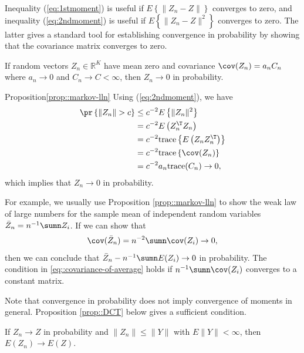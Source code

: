 Inequality (\ref{eq:1stmoment}) is useful if $E\left\{ \|Z_{n}-Z\|\right\} $
converges to zero, and inequality (\ref{eq:2ndmoment}) is useful
if $E\left\{ \|Z_{n}-Z\|^{2}\right\} $ converges to zero. The latter
gives a standard tool for establishing convergence in probability
by showing that the covariance matrix converges to zero.

\begin{proposition}\label{prop::markov-lln}
If random vectors $Z_{n}\in\mathbb{R}^{K}$ have mean zero and covariance
$\cov(Z_{n})=a_{n}C_{n}$ where $a_{n}\rightarrow0$ and $C_{n}\rightarrow C<\infty$,
then $Z_{n}\rightarrow0$ in probability. 
\end{proposition}


\begin{myproof}{Proposition}{\ref{prop::markov-lln}}
Using (\ref{eq:2ndmoment}), we have
\begin{align*}
\pr\left\{ \|Z_{n}\|>c\right\}  & \leq c^{-2}E\left\{ \|Z_{n}\|^{2}\right\} \\
 & =c^{-2}E\left(Z_{n}^{\T}Z_{n}\right)\\
 & =c^{-2}\text{trace}\left\{ E\left(Z_{n}Z_{n}^{\T}\right)\right\} \\
 & =c^{-2}\text{trace}\left\{ \cov(Z_{n})\right\} \\
 & =c^{-2}a_{n}\text{trace}(C_{n})\rightarrow0,
\end{align*}
which implies that $Z_{n}\rightarrow0$ in probability. 
\end{myproof}

For example, we usually use Proposition \ref{prop::markov-lln} to show the weak law of large numbers for the sample mean of independent random variables $\bar{Z}_n = n^{-1} \sumn Z_i$. If we can show that
\begin{eqnarray}
\cov( \bar{Z}_n   ) = n^{-2} \sumn \cov(Z_i) \rightarrow 0,
\label{eq::covariance-of-average}
\end{eqnarray}
then we can conclude that $\bar{Z}_n - n^{-1} \sumn E(Z_i) \rightarrow 0$ in probability. The condition in \eqref{eq::covariance-of-average} holds if $n^{-1} \sumn \cov(Z_i) $ converges to a constant matrix. 



Note that convergence in probability does not imply convergence of moments in general. Proposition \ref{prop::DCT} below gives a sufficient condition. 


\begin{proposition}\label{prop::DCT}
If $Z_n \rightarrow Z$ in probability and $\| Z_n \| \leq \| Y \|$ with $E\| Y\| < \infty$, then $E(Z_n) \rightarrow E(Z)$. 
\end{proposition}


